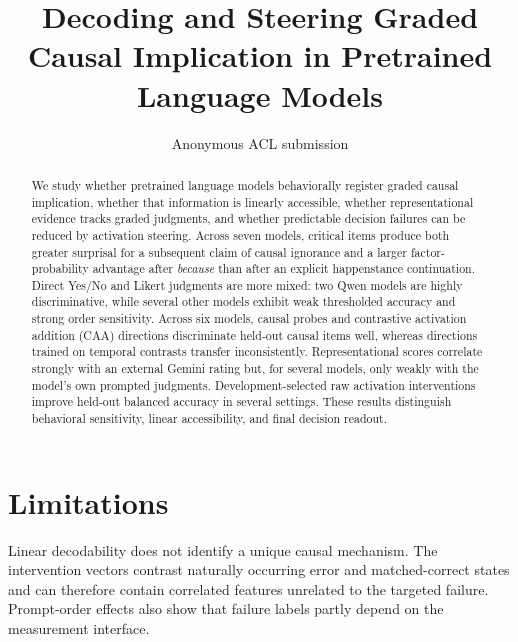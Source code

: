 \documentclass[11pt]{article}
\title{Decoding and Steering Graded Causal Implication in Pretrained Language Models}
\author{Anonymous ACL submission}
\newif\ifcompiledfromparent
\begin{document}
\maketitle

\begin{abstract}
We study whether pretrained language models behaviorally register graded causal implication, whether that information is linearly accessible, whether representational evidence tracks graded judgments, and whether predictable decision failures can be reduced by activation steering. Across seven models, critical items produce both greater surprisal for a subsequent claim of causal ignorance and a larger factor-probability advantage after \emph{because} than after an explicit happenstance continuation. Direct Yes/No and Likert judgments are more mixed: two Qwen models are highly discriminative, while several other models exhibit weak thresholded accuracy and strong order sensitivity. Across six models, causal probes and contrastive activation addition (CAA) directions discriminate held-out causal items well, whereas directions trained on temporal contrasts transfer inconsistently. Representational scores correlate strongly with an external Gemini rating but, for several models, only weakly with the model's own prompted judgments. Development-selected raw activation interventions improve held-out balanced accuracy in several settings. These results distinguish behavioral sensitivity, linear accessibility, and final decision readout.
\end{abstract}





\section*{Limitations}
Linear decodability does not identify a unique causal mechanism. The intervention vectors contrast naturally occurring error and matched-correct states and can therefore contain correlated features unrelated to the targeted failure. Prompt-order effects also show that failure labels partly depend on the measurement interface.

\ifcompiledfromparent
  
\else
  
\fi

\appendix

\end{document}
